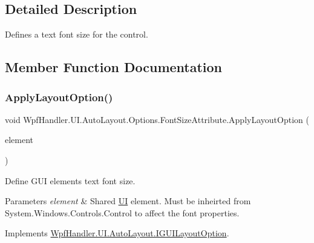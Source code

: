 \subsection{Detailed Description}
Defines a text font size for the control. 



\subsection{Member Function Documentation}
\mbox{\label{class_wpf_handler_1_1_u_i_1_1_auto_layout_1_1_options_1_1_font_size_attribute_abd93e70e5419e81c4dfdd9b5d1f35343}} 
\subsubsection{\texorpdfstring{Apply\+Layout\+Option()}{ApplyLayoutOption()}}
{\footnotesize\ttfamily void Wpf\+Handler.\+U\+I.\+Auto\+Layout.\+Options.\+Font\+Size\+Attribute.\+Apply\+Layout\+Option (\begin{DoxyParamCaption}\item[{Framework\+Element}]{element }\end{DoxyParamCaption})}



Define G\+UI element\textquotesingle{}s text font size. 


\begin{DoxyParams}{Parameters}
{\em element} & Shared \mbox{\hyperlink{namespace_wpf_handler_1_1_u_i}{UI}} element. Must be inheirted from {\ttfamily System.\+Windows.\+Controls.\+Control} to affect the font properties. \\
\hline
\end{DoxyParams}


Implements \mbox{\hyperlink{interface_wpf_handler_1_1_u_i_1_1_auto_layout_1_1_i_g_u_i_layout_option_ac2d2fa8aeaf753b3248381399f991005}{Wpf\+Handler.\+U\+I.\+Auto\+Layout.\+I\+G\+U\+I\+Layout\+Option}}.



